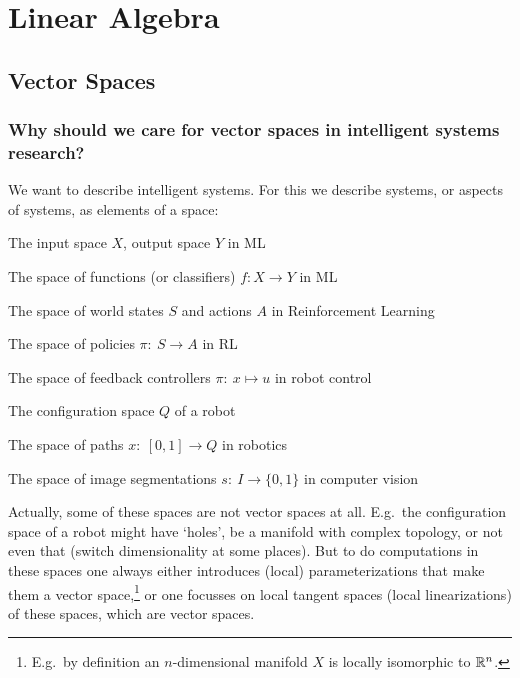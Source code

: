 


%




\section{Linear Algebra}

\subsection{Vector Spaces}

\subsubsection{Why should we care for vector spaces in intelligent systems
research?}

We want to describe intelligent systems. For this we describe systems,
or aspects of systems, as elements of a space:
\begin{items}
\item The input space $X$, output space $Y$ in ML
\item The space of functions (or classifiers) $f: X \to Y $ in
ML
\item The space of world states $S$ and actions $A$ in Reinforcement Learning
\item The space of policies $\pi:~ S \to A$ in RL
\item The space of feedback controllers $\pi:~ x \mapsto u$ in robot control
\item The configuration space $Q$ of a robot
\item The space of paths $x:~ [0,1] \to Q$ in robotics
\item The space of image segmentations $s:~ I \to \{0,1\}$ in computer vision
\end{items}
Actually, some of these spaces are not vector spaces at all. E.g.\ the
configuration space of a robot might have `holes', be a manifold with
complex topology, or not even that (switch dimensionality at some
places). But to do computations in these spaces one always either
introduces (local) parameterizations that make them a vector
space,\footnote{E.g.\ by definition an $n$-dimensional manifold $X$
is locally isomorphic to ${\mathbb{R}}^n$.} or one focusses on local tangent
spaces (local linearizations) of these spaces, which are vector
spaces.

